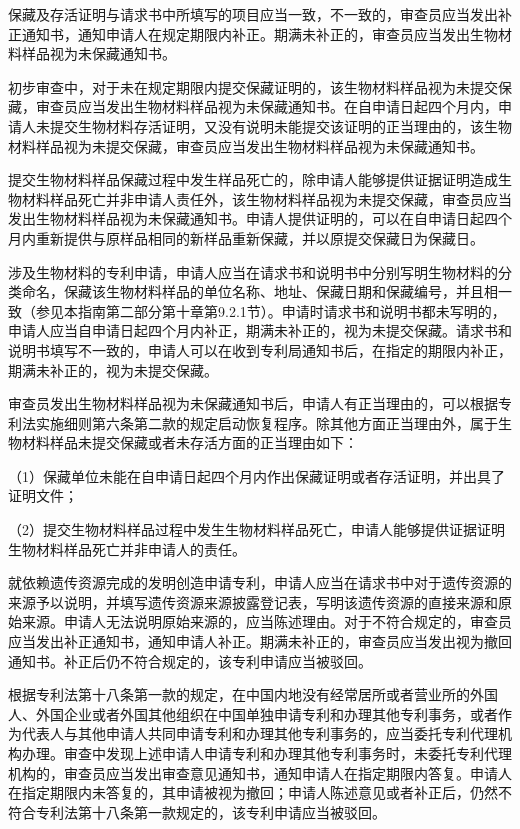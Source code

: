 保藏及存活证明与请求书中所填写的项目应当一致，不一致的，审查员应当发出补正通知书，通知申请人在规定期限内补正。期满未补正的，审查员应当发出生物材料样品视为未保藏通知书。

初步审查中，对于未在规定期限内提交保藏证明的，该生物材料样品视为未提交保藏，审查员应当发出生物材料样品视为未保藏通知书。在自申请日起四个月内，申请人未提交生物材料存活证明，又没有说明未能提交该证明的正当理由的，该生物材料样品视为未提交保藏，审查员应当发出生物材料样品视为未保藏通知书。

提交生物材料样品保藏过程中发生样品死亡的，除申请人能够提供证据证明造成生物材料样品死亡并非申请人责任外，该生物材料样品视为未提交保藏，审查员应当发出生物材料样品视为未保藏通知书。申请人提供证明的，可以在自申请日起四个月内重新提供与原样品相同的新样品重新保藏，并以原提交保藏日为保藏日。

涉及生物材料的专利申请，申请人应当在请求书和说明书中分别写明生物材料的分类命名，保藏该生物材料样品的单位名称、地址、保藏日期和保藏编号，并且相一致（参见本指南第二部分第十章第9.2.1节）。申请时请求书和说明书都未写明的，申请人应当自申请日起四个月内补正，期满未补正的，视为未提交保藏。请求书和说明书填写不一致的，申请人可以在收到专利局通知书后，在指定的期限内补正，期满未补正的，视为未提交保藏。

审查员发出生物材料样品视为未保藏通知书后，申请人有正当理由的，可以根据专利法实施细则第六条第二款的规定启动恢复程序。除其他方面正当理由外，属于生物材料样品未提交保藏或者未存活方面的正当理由如下：

{\setlength{\parindent}{17.1bp}（1）保藏单位未能在自申请日起四个月内作出保藏证明或者存活证明，并出具了证明文件；\par}

{\setlength{\parindent}{17.1bp}（2）提交生物材料样品过程中发生生物材料样品死亡，申请人能够提供证据证明生物材料样品死亡并非申请人的责任。\par}

就依赖遗传资源完成的发明创造申请专利，申请人应当在请求书中对于遗传资源的来源予以说明，并填写遗传资源来源披露登记表，写明该遗传资源的直接来源和原始来源。申请人无法说明原始来源的，应当陈述理由。对于不符合规定的，审查员应当发出补正通知书，通知申请人补正。期满未补正的，审查员应当发出视为撤回通知书。补正后仍不符合规定的，该专利申请应当被驳回。

根据专利法第十八条第一款的规定，在中国内地没有经常居所或者营业所的外国人、外国企业或者外国其他组织在中国单独申请专利和办理其他专利事务，或者作为代表人与其他申请人共同申请专利和办理其他专利事务的，应当委托专利代理机构办理。审查中发现上述申请人申请专利和办理其他专利事务时，未委托专利代理机构的，审查员应当发出审查意见通知书，通知申请人在指定期限内答复。申请人在指定期限内未答复的，其申请被视为撤回；申请人陈述意见或者补正后，仍然不符合专利法第十八条第一款规定的，该专利申请应当被驳回。

